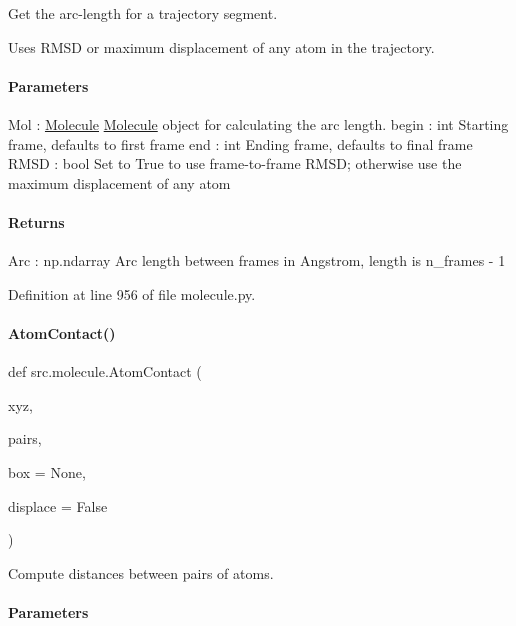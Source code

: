Get the arc-\/length for a trajectory segment. 

Uses R\+M\+SD or maximum displacement of any atom in the trajectory.

\paragraph*{Parameters }

Mol \+: \hyperlink{classsrc_1_1molecule_1_1Molecule}{Molecule} \hyperlink{classsrc_1_1molecule_1_1Molecule}{Molecule} object for calculating the arc length. begin \+: int Starting frame, defaults to first frame end \+: int Ending frame, defaults to final frame R\+M\+SD \+: bool Set to True to use frame-\/to-\/frame R\+M\+SD; otherwise use the maximum displacement of any atom

\paragraph*{Returns }

Arc \+: np.\+ndarray Arc length between frames in Angstrom, length is n\+\_\+frames -\/ 1 

Definition at line 956 of file molecule.\+py.

\mbox{\label{namespacesrc_1_1molecule_a8f70cfe4842e1f08578785ef9a95babc}} 
\paragraph{\texorpdfstring{Atom\+Contact()}{AtomContact()}}
{\footnotesize\ttfamily def src.\+molecule.\+Atom\+Contact (\begin{DoxyParamCaption}\item[{}]{xyz,  }\item[{}]{pairs,  }\item[{}]{box = {\ttfamily None},  }\item[{}]{displace = {\ttfamily False} }\end{DoxyParamCaption})}



Compute distances between pairs of atoms. 

\paragraph*{Parameters }

